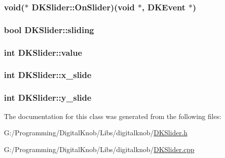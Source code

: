 \hypertarget{class_d_k_slider_a5e5a2496f8a2695d531cb0331d9302e1}{
\subsubsection[{On\-Slider}]{\setlength{\rightskip}{0pt plus 5cm}void($\ast$ D\-K\-Slider\-::\-On\-Slider)(void $\ast$, {\bf D\-K\-Event} $\ast$)}}\label{class_d_k_slider_a5e5a2496f8a2695d531cb0331d9302e1}
\hypertarget{class_d_k_slider_a84434d2cd918f667e412276674dda39c}{
\subsubsection[{sliding}]{\setlength{\rightskip}{0pt plus 5cm}bool D\-K\-Slider\-::sliding}}\label{class_d_k_slider_a84434d2cd918f667e412276674dda39c}
\hypertarget{class_d_k_slider_a6c9b163fcbe897529a44673849081a1f}{
\subsubsection[{value}]{\setlength{\rightskip}{0pt plus 5cm}int D\-K\-Slider\-::value}}\label{class_d_k_slider_a6c9b163fcbe897529a44673849081a1f}
\hypertarget{class_d_k_slider_a2e905736e93966591ef3721b34e321b3}{
\subsubsection[{x\-\_\-slide}]{\setlength{\rightskip}{0pt plus 5cm}int D\-K\-Slider\-::x\-\_\-slide}}\label{class_d_k_slider_a2e905736e93966591ef3721b34e321b3}
\hypertarget{class_d_k_slider_addde7705a1c8c259909673c014a993a4}{
\subsubsection[{y\-\_\-slide}]{\setlength{\rightskip}{0pt plus 5cm}int D\-K\-Slider\-::y\-\_\-slide}}\label{class_d_k_slider_addde7705a1c8c259909673c014a993a4}


The documentation for this class was generated from the following files\-:\begin{DoxyCompactItemize}
\item 
G\-:/\-Programming/\-Digital\-Knob/\-Libs/digitalknob/\hyperlink{_d_k_slider_8h}{D\-K\-Slider.\-h}\item 
G\-:/\-Programming/\-Digital\-Knob/\-Libs/digitalknob/\hyperlink{_d_k_slider_8cpp}{D\-K\-Slider.\-cpp}\end{DoxyCompactItemize}
